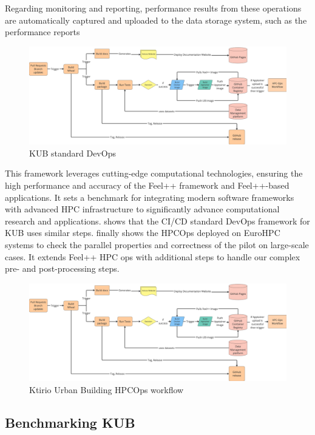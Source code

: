 \documentclass[runningheads]{llncs}
\begin{document}
Regarding monitoring and reporting, performance results from these operations are automatically captured and uploaded to the data storage system, such as the performance reports

\begin{figure}
    \centering
    \includegraphics[width=\linewidth,page=1]{img-ub-devops-hpcops.pdf}
    \caption{KUB standard DevOps}
    \label{fig:kub-devops}
\end{figure}
This framework leverages cutting-edge computational technologies, ensuring the high performance and accuracy of the Feel++ framework and Feel++-based applications.
It sets a benchmark for integrating modern software frameworks with advanced HPC infrastructure to significantly advance computational research and applications.
 shows that the CI/CD standard DevOps framework for KUB uses similar steps.
 finally shows the HPCOps deployed on EuroHPC systems to check the parallel properties and correctness of the pilot on large-scale cases. It extends Feel++ HPC ops with additional steps to handle our complex pre- and post-processing steps.

\begin{figure}
    \centering
    \includegraphics[width=\linewidth,page=2]{img-ub-devops-hpcops.pdf}
    \caption{Ktirio Urban Building HPCOps workflow}
    \label{fig:kub-hpcops}
\end{figure}

\subsection{Benchmarking KUB}
\label{sec:benchmarking}
\end{document}
